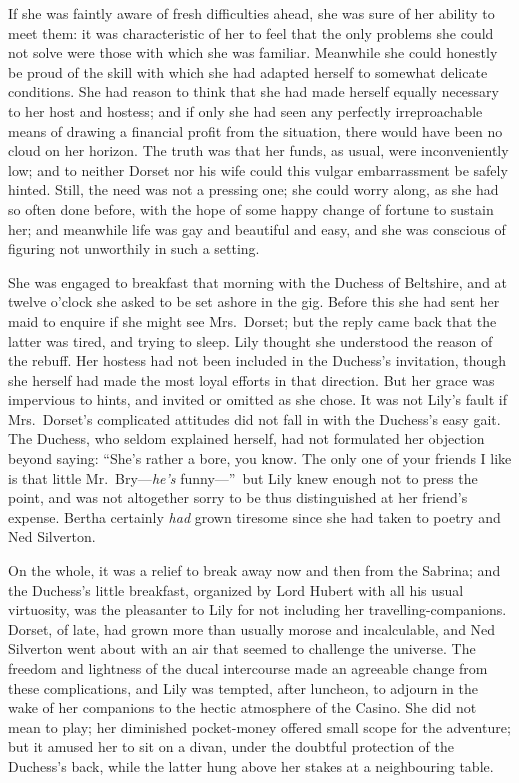 \documentclass[12pt,a4paper]{book}
\begin{document}
If she was faintly aware of fresh difficulties ahead, she was
sure of her ability to meet them: it was characteristic of her to
feel that the only problems she could not solve were those with
which she was familiar. Meanwhile she could honestly be proud of
the skill with which she had adapted herself to somewhat delicate
conditions. She had reason to think that she had made herself
equally necessary to her host and hostess; and if only she had
seen any perfectly irreproachable means of drawing a financial
profit from the situation, there would have been no cloud on her
horizon. The truth was that her funds, as usual, were
inconveniently low; and to neither Dorset nor his wife could this
vulgar embarrassment be safely hinted. Still, the need was not a
pressing one; she could worry along, as she had so often done
before, with the hope of some happy change of fortune to sustain
her; and meanwhile life was gay and beautiful and easy, and she
was conscious of figuring not unworthily in such a setting.





She was engaged to breakfast that morning with the Duchess of
Beltshire, and at twelve o'clock she asked to be set ashore in
the gig. Before this she had sent her maid to enquire if she
might see Mrs.\ Dorset; but the reply came back that the latter
was tired, and trying to sleep. Lily thought she understood the
reason of the rebuff. Her hostess had not been included in the
Duchess's invitation, though she herself had made the
most loyal efforts in that direction. But her grace was
impervious to hints, and invited or omitted as she chose. It was
not Lily's fault if Mrs.\ Dorset's complicated attitudes did not
fall in with the Duchess's easy gait. The Duchess, who seldom
explained herself, had not formulated her objection beyond
saying: ``She's rather a bore, you know. The only one of your
friends I like is that little Mr.\ Bry---\textit{he's} funny---''\ but Lily
knew enough not to press the point, and was not altogether sorry
to be thus distinguished at her friend's expense. Bertha
certainly \textit{had} grown tiresome since she had taken to poetry and
Ned Silverton.





On the whole, it was a relief to break away now and then from the
Sabrina; and the Duchess's little breakfast, organized by Lord
Hubert with all his usual virtuosity, was the pleasanter to Lily
for not including her travelling-companions. Dorset, of late, had
grown more than usually morose and incalculable, and Ned
Silverton went about with an air that seemed to challenge the
universe. The freedom and lightness of the ducal intercourse made
an agreeable change from these complications, and Lily was
tempted, after luncheon, to adjourn in the wake of her companions
to the hectic atmosphere of the Casino. She did not mean to play;
her diminished pocket-money offered small scope for the
adventure; but it amused her to sit on a divan, under the
doubtful protection of the Duchess's back, while the latter hung
above her stakes at a neighbouring table.
\end{document}
